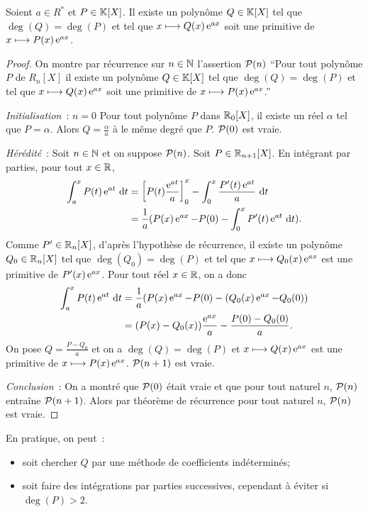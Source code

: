 \begin{prop}
  Soient \(a \in R^*\) et \(P \in \K[X]\). Il existe un polynôme \(Q \in \K[X]\) 
  tel que \(\deg(Q) = \deg(P)\) et tel que \(x \longmapsto Q(x)\e^{ax}\) soit une 
  primitive de \(x \longmapsto P(x)\e^{ax}\).
\end{prop}
\begin{proof}
  On montre par récurrence sur \(n \in \N\) l'assertion \(\P(n)\) ``Pour tout 
  polynôme \(P\) de \(R_n[X]\) il existe un polynôme \(Q \in \K[X]\) tel que 
  \(\deg(Q) = \deg(P)\) et tel que \(x \longmapsto Q(x)\e^{ax}\) soit une 
  primitive de \(x \longmapsto P(x)\e^{ax}\).''

  \emph{Initialisation}~: \(n = 0\) Pour tout polynôme \(P\) dans \(\R_0[X]\), il 
  existe un réel \(\alpha\) tel que \(P = \alpha\). Alors \(Q = \frac{\alpha}{a}\) à 
  le même degré que \(P\). \(\P(0)\) est vraie.

  \emph{Hérédité}~: Soit \(n \in \N\) et on suppose \(\P(n)\). Soit \(P \in 
  \R_{n+1}[X]\). En intégrant par parties, pour tout \(x \in \R\),
  \begin{align*}
    \int_a^x P(t)\e^{at}\,\diff t &= \left[P(t)\frac{\e^{at}}{a}\right]_0^x - 
    \int_0^x \frac{P'(t)\e^{at}}{a}\,\diff t \\
    & = \frac{1}{a}(P(x)\e^{ax} -P(0) - \int_0^x P'(t)\e^{at}\,\diff t ).
  \end{align*}
  Comme \(P'\in\R_n[X]\), d'après l'hypothèse de récurrence, il existe un 
  polynôme \(Q_0 \in \R_n[X]\) tel que \(\deg(Q_0) = \deg(P)\) et tel que \(x 
  \longmapsto Q_0(x)\e^{ax}\) est une primitive de \(P'(x)\e^{ax}\). Pour tout 
  réel \(x \in \R\), on a donc
  \begin{align*}
    \int_a^x P(t)\e^{at}\,\diff t &= \frac{1}{a}(P(x)\e^{ax} -P(0) - 
    (Q_0(x)\e^{ax}-Q_0(0))\\
    & = (P(x)-Q_0(x))\frac{\e^{ax}}{a} - \frac{P(0)-Q_0(0)}{a}.
  \end{align*}
  On pose \(Q = \frac{P-Q_0}{a}\) et on a \(\deg(Q) = \deg(P)\) et \(x\longmapsto 
  Q(x)\e^{ax}\) est une primitive de \(x\longmapsto P(x)\e^{ax}\). \(\P(n+1)\) 
  est vraie.

  \emph{Conclusion}~: On a montré que \(\P(0)\) était vraie et que pour tout 
  naturel \(n\), \(\P(n)\) entraîne \(\P(n+1)\). Alors par théorème de 
  récurrence pour tout naturel \(n\), \(\P(n)\) est vraie.
\end{proof}

En pratique, on peut~:
\begin{itemize}
  \item soit chercher \(Q\) par une méthode de coefficients indéterminés;
  \item soit faire des intégrations par parties successives, cependant à éviter 
    si \(\deg(P) >2\).
\end{itemize}

